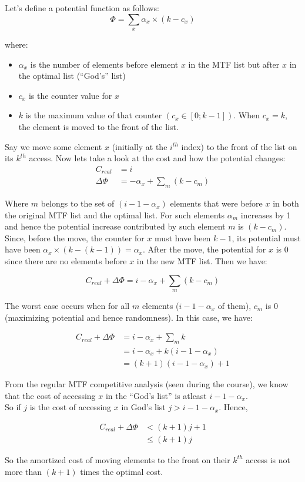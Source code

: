Let's define a potential function as follows: \\

\[
  \Phi = \sum\limits_{x} \alpha_{x} \times (k - c_{x})
\]

where:
\begin{itemize}
  \item $\alpha_{x}$ is the number of elements before element $x$ in the MTF list but after $x$ in the optimal list (``God’s'' list)
  \item $c_{x}$ is the counter value for $x$
  \item $k$ is the maximum value of that counter $(c_{x} \in [0; k-1])$. When $c_{x} = k$, the element is moved to the front of the list.
\end{itemize}

Say we move some element $x$ (initially at the $i^{th}$ index) to the front of the list on its $k^{th}$ access. Now lets take a look at the cost and how the potential changes:\\
\[
\begin{array}{ll}
  C_{real} & = i\\
  \Delta \Phi & = - \alpha_{x} + \sum\limits_{m} (k - c_m)
\end{array}
\]

Where $m$ belongs to the set of $(i - 1 - \alpha_{x})$ elements that were before $x$ in both the original MTF list and the optimal list. For such elements $\alpha_m$ increases by 1 and hence the potential increase contributed by such element $m$ is $(k - c_m)$. Since, before the move, the counter for $x$ must have been $k - 1$, its potential must have been $\alpha_{x} \times (k - (k - 1)) = \alpha_{x}$. After the move, the potential for $x$ is $0$ since there are no elements before $x$ in the new MTF list. Then we have:

\[
  C_{real} + \Delta \Phi = i - \alpha_{x} + \sum\limits_{m} (k - c_m)
\]

The worst case occurs when for all $m$ elements ($i - 1 - \alpha_{x}$ of them), $c_m$ is $0$ (maximizing potential and hence randomness). In this case, we have:

\[
\begin{array}{ll}
  C_{real} + \Delta \Phi
    & = i - \alpha_{x} + \sum\limits_{m} k \\
    & = i - \alpha_{x} + k(i - 1 - \alpha_{x}) \\
    & = (k+1)(i - 1- \alpha_{x}) + 1
\end{array}
\]

From the regular MTF competitive analysis (seen during the course), we know that the cost of accessing $x$ in the ``God’s list'' is atleast $i - 1 - \alpha_{x}$.\\
So if $j$ is the cost of accessing $x$ in God’s list $j > i - 1 - \alpha_{x}$. Hence,

\[
\begin{array}{ll}
  C_{real} + \Delta \Phi & < (k + 1)j + 1 \\
                         & \leq (k + 1)j
\end{array}
\]

So the amortized cost of moving elements to the front on their $k^{th}$ access is not more than $(k+1)$ times the optimal cost.
